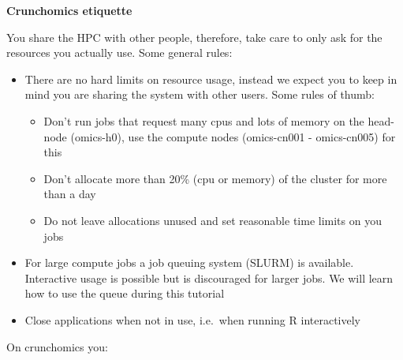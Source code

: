 \documentclass[
  letterpaper,
  DIV=11,
  numbers=noendperiod]{scrreprt}
\providecommand{\tightlist}{%
  \setlength{\itemsep}{0pt}\setlength{\parskip}{0pt}}\usepackage{longtable,booktabs,array}
\begin{document}
\begin{tcolorbox}[enhanced jigsaw, breakable, colframe=quarto-callout-important-color-frame, titlerule=0mm, colbacktitle=quarto-callout-important-color!10!white, toptitle=1mm, colback=white, opacityback=0, opacitybacktitle=0.6, rightrule=.15mm, left=2mm, bottomtitle=1mm, coltitle=black, title=\textcolor{quarto-callout-important-color}{\faExclamation}\hspace{0.5em}{Important}, arc=.35mm, bottomrule=.15mm, leftrule=.75mm, toprule=.15mm]

\textbf{Crunchomics etiquette}

You share the HPC with other people, therefore, take care to only ask
for the resources you actually use. Some general rules:

\begin{itemize}
\tightlist
\item
  There are no hard limits on resource usage, instead we expect you to
  keep in mind you are sharing the system with other users. Some rules
  of thumb:

  \begin{itemize}
  \tightlist
  \item
    Don't run jobs that request many cpus and lots of memory on the
    head-node (omics-h0), use the compute nodes (omics-cn001 -
    omics-cn005) for this
  \item
    Don't allocate more than 20\% (cpu or memory) of the cluster for
    more than a day
  \item
    Do not leave allocations unused and set reasonable time limits on
    you jobs
  \end{itemize}
\item
  For large compute jobs a job queuing system (SLURM) is available.
  Interactive usage is possible but is discouraged for larger jobs. We
  will learn how to use the queue during this tutorial
\item
  Close applications when not in use, i.e.~when running R interactively
\end{itemize}

\end{tcolorbox}

On crunchomics you:
\end{document}
